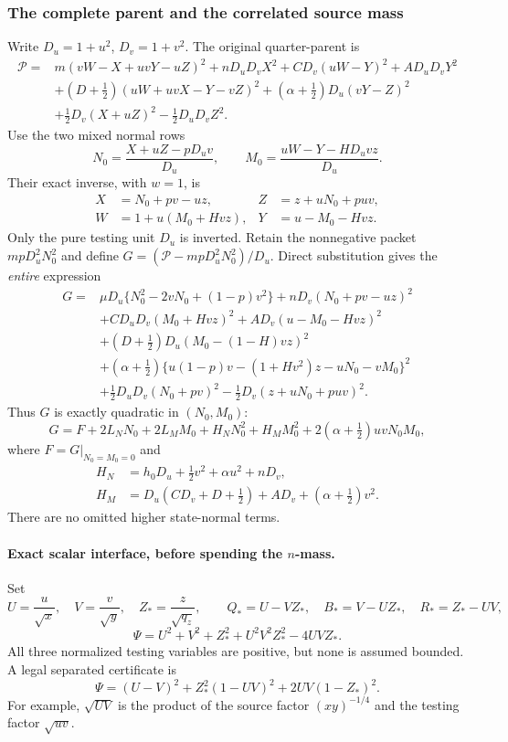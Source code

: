 \subsubsection*{The complete parent and the correlated source mass}

Write $D_u=1+u^2$, $D_v=1+v^2$.  The original quarter-parent is
\begin{align}
 \mathcal P={}&m(vW-X+uvY-uZ)^2+nD_uD_vX^2
  +CD_v(uW-Y)^2+AD_uD_vY^2\\
 &+(D+\tfrac12)(uW+uvX-Y-vZ)^2
  +(\alpha+\tfrac12)D_u(vY-Z)^2\\
 &+\tfrac12D_v(X+uZ)^2-\tfrac12D_uD_vZ^2.               \tag{RFN4}
\end{align}
Use the two mixed normal rows
\[
 N_0=\frac{X+uZ-pD_uv}{D_u},\qquad
 M_0=\frac{uW-Y-HD_uvz}{D_u}.                            \tag{RFN5}
\]
Their exact inverse, with $w=1$, is
\[
 \begin{aligned}
 X&=N_0+pv-uz,&Z&=z+uN_0+puv,\\
 W&=1+u(M_0+Hvz),&Y&=u-M_0-Hvz.
 \end{aligned}                                           \tag{RFN6}
\]
Only the pure testing unit $D_u$ is inverted.  Retain the nonnegative
packet $mpD_u^2N_0^2$ and define
$G=(\mathcal P-mpD_u^2N_0^2)/D_u$.  Direct substitution gives the
\emph{entire} expression
\begin{align}
 G={}&\mu D_u\{N_0^2-2vN_0+(1-p)v^2\}
       +nD_v(N_0+pv-uz)^2\\
 &+CD_uD_v(M_0+Hvz)^2+A D_v(u-M_0-Hvz)^2\\
 &+(D+\tfrac12)D_u(M_0-(1-H)vz)^2\\
 &+(\alpha+\tfrac12)
   \{u(1-p)v-(1+Hv^2)z-uN_0-vM_0\}^2\\
 &+\tfrac12D_uD_v(N_0+pv)^2
       -\tfrac12D_v(z+uN_0+puv)^2.                      \tag{RFN7}
\end{align}
Thus $G$ is exactly quadratic in $(N_0,M_0)$:
\[
 G=F+2L_NN_0+2L_MM_0+H_NN_0^2+H_MM_0^2
                  +2(\alpha+\tfrac12)uvN_0M_0,          \tag{RFN8}
\]
where $F=G|_{N_0=M_0=0}$ and
\[
 \begin{split}
 H_N&=h_0D_u+\tfrac12v^2+\alpha u^2+nD_v,\\
 H_M&=D_u(CD_v+D+\tfrac12)+AD_v+(\alpha+\tfrac12)v^2.
 \end{split}                                           \tag{RFN9}
\]
There are no omitted higher state-normal terms.

\paragraph{Exact scalar interface, before spending the $n$-mass.}
Set
\[
 U=\frac u{\sqrt x},\quad V=\frac v{\sqrt y},\quad
 Z_* =\frac z{\sqrt{q_z}},\qquad
 Q_*=U-VZ_*,\quad B_*=V-UZ_*,\quad R_*=Z_*-UV,
\]
\[
 \Psi=U^2+V^2+Z_*^2+U^2V^2Z_*^2-4UVZ_*.                 \tag{RFN10}
\]
All three normalized testing variables are positive, but none is
assumed bounded.  A legal separated certificate is
\[
 \Psi=(U-V)^2+Z_*^2(1-UV)^2+2UV(1-Z_*)^2.               \tag{RFN11}
\]
For example, $\sqrt{UV}$ is the product of the source factor
$(xy)^{-1/4}$ and the testing factor $\sqrt{uv}$.

